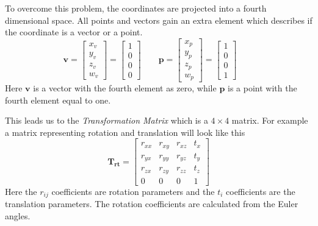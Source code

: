 To overcome this problem, the coordinates are projected into a fourth dimensional space.
All points and vectors gain an extra element which describes if the coordinate is a vector
or a point. 
\begin{equation}
        \mathbf{v} = \left[ \begin{array}{c}
                                    x_v \\
                                    y_v \\
                                    z_v \\
                                    w_v  \end{array} \right]  =
                     \left[ \begin{array}{c}
                                    1 \\
                                    0 \\
                                    0 \\
                                    0  \end{array} \right] \quad \quad
        \mathbf{p} = \left[ \begin{array}{c}
                                    x_p \\
                                    y_p \\
                                    z_p \\
                                    w_p  \end{array} \right]  =
                     \left[ \begin{array}{c}
                                    1 \\
                                    0 \\
                                    0 \\
                                    1  \end{array} \right] \quad \quad
\end{equation}
Here $\mathbf{v}$ is a vector with the fourth element as zero, while $\mathbf{p}$ is a
point with the fourth element equal to one.

This leads us to the \emph{Transformation Matrix} which is a $4 \times 4$ matrix. For
example a matrix representing rotation and translation will look like this
\begin{equation}
    \label{chap2:eq-TransformationMatrix}
    \mathbf{T_{rt}} = \left [ \begin{array}{cccc}
                                r_{xx} & r_{xy} & r_{xz} & t_x \\
                                r_{yx} & r_{yy} & r_{yz} & t_y \\
                                r_{zx} & r_{zy} & r_{zz} & t_z \\
                                0  & 0  & 0  & 1  \end{array} \right]
\end{equation}
Here the $r_{ij}$ coefficients are rotation parameters and the $t_i$ coefficients are the
translation parameters. The rotation coefficients are calculated from the Euler angles.

